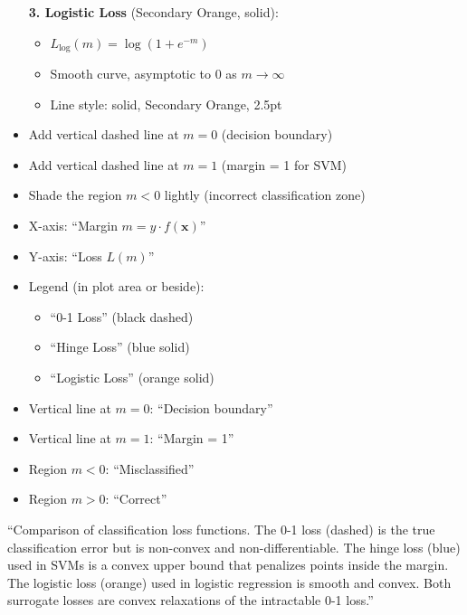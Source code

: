 \documentclass[12pt]{article}
\begin{document}
\begin{description}[style=nextline, leftmargin=0pt]
\begin{itemize}
        \textbf{3. Logistic Loss} (Secondary Orange, solid):
        \begin{itemize}
            \item $L_{\text{log}}(m) = \log(1 + e^{-m})$
            \item Smooth curve, asymptotic to 0 as $m \to \infty$
            \item Line style: solid, Secondary Orange, 2.5pt
        \end{itemize}

        \item Add vertical dashed line at $m = 0$ (decision boundary)
        \item Add vertical dashed line at $m = 1$ (margin = 1 for SVM)
        \item Shade the region $m < 0$ lightly (incorrect classification zone)
    \end{itemize}

    \item[Required Labels]
    \begin{itemize}
        \item X-axis: ``Margin $m = y \cdot f(\mathbf{x})$''
        \item Y-axis: ``Loss $L(m)$''
        \item Legend (in plot area or beside):
        \begin{itemize}
            \item ``0-1 Loss'' (black dashed)
            \item ``Hinge Loss'' (blue solid)
            \item ``Logistic Loss'' (orange solid)
        \end{itemize}
        \item Vertical line at $m=0$: ``Decision boundary''
        \item Vertical line at $m=1$: ``Margin = 1''
        \item Region $m < 0$: ``Misclassified''
        \item Region $m > 0$: ``Correct''
    \end{itemize}

    \item[Caption Text]
    ``Comparison of classification loss functions. The 0-1 loss (dashed) is the true classification error but is non-convex and non-differentiable. The hinge loss (blue) used in SVMs is a convex upper bound that penalizes points inside the margin. The logistic loss (orange) used in logistic regression is smooth and convex. Both surrogate losses are convex relaxations of the intractable 0-1 loss.''


\end{description}
\end{document}
